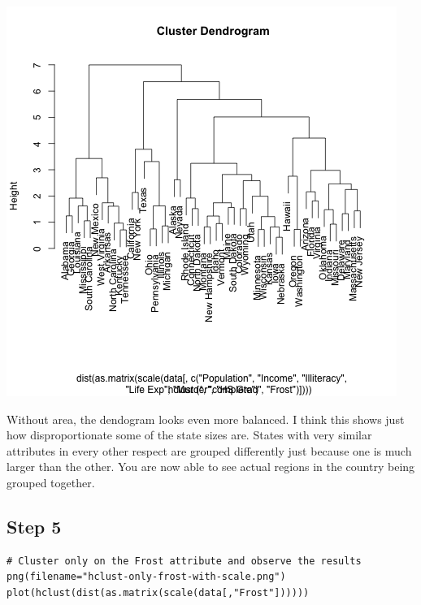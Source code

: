 \documentclass[11pt]{article}
\begin{document}
\begin{center}
\includegraphics[width=.9\linewidth]{hclust-no-area-with-scale.png}
\end{center}

Without area, the dendogram looks even more balanced. I think this shows just
how disproportionate some of the state sizes are. States with very similar
attributes in every other respect are grouped differently just because one is
much larger than the other. You are now able to see actual regions in the
country being grouped together. 

\subsection*{Step 5}
\label{sec:orgca6b404}

\begin{verbatim}
# Cluster only on the Frost attribute and observe the results
png(filename="hclust-only-frost-with-scale.png")
plot(hclust(dist(as.matrix(scale(data[,"Frost"])))))
\end{verbatim}
\end{document}
